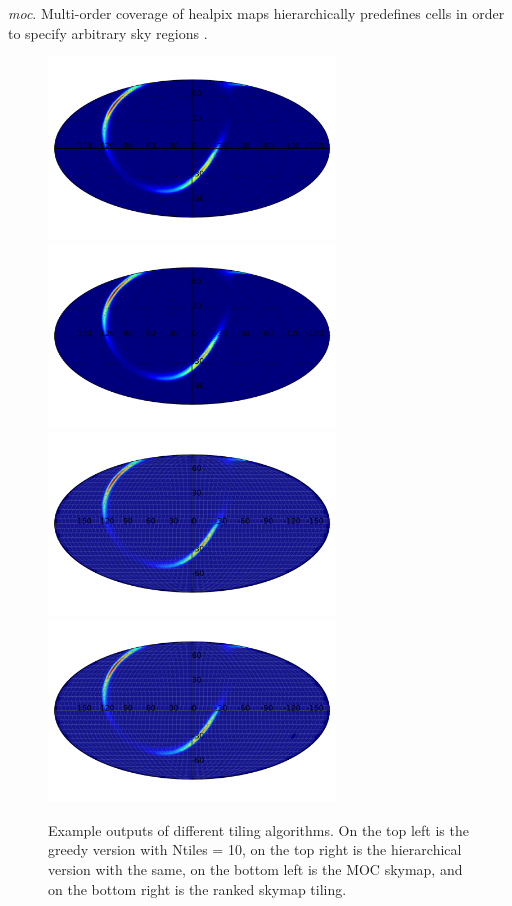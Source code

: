 \documentclass[twocolumn]{aastex61}
\begin{document}
\emph{moc}. Multi-order coverage of healpix maps hierarchically predefines cells in order to specify arbitrary sky regions \cite{FeBo2014}.
\begin{figure}
    \centering
    \includegraphics[width=3in]{tiling_greedy}
    \includegraphics[width=3in]{tiling_hierarchical}
    \includegraphics[width=3in]{tiling_moc}
    \includegraphics[width=3in]{tiling_ranked}
    \caption{Example outputs of different tiling algorithms. On the top left is the greedy version with Ntiles = 10, on the top right is the hierarchical version with the same, on the bottom left is the MOC skymap, and on the bottom right is the ranked skymap tiling.}
    \label{fig:tiling}
\end{figure}
\end{document}
